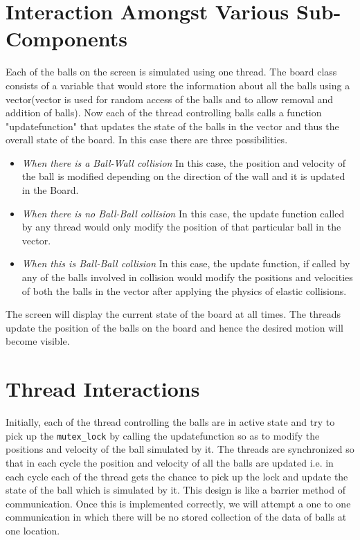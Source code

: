 \documentclass{article}
\begin{document}
\section{Interaction Amongst Various Sub-Components}
Each of the balls on the screen is simulated using one thread. The board class consists of a variable that would store the information about all the balls using a vector(vector is used for random access of the balls and to allow removal and addition of balls). Now each of the thread controlling balls calls a function "updatefunction" that updates the state of the balls in the vector and thus the overall state of the board. In this case there are three possibilities.
\begin{itemize}
\item \textit{When there is a Ball-Wall collision} In this case, the position and velocity of the ball is modified depending on the direction of the wall and it is updated in the Board.
\item \textit{When there is no Ball-Ball collision} In this case, the update function called by any thread would only modify the position of that particular ball in the vector.
\item\textit{When this is Ball-Ball collision} In this case, the update function, if called by any of the balls involved in  collision would modify the positions and velocities of both the balls in the vector after applying the physics of elastic collisions. 
\end{itemize}
The screen will display the current state of the board at all times. The threads update the position of the balls on the board and hence the desired motion will become visible.

\section{Thread Interactions}
Initially, each of the thread controlling the balls are in active state and try to pick up the \texttt{mutex\_lock} by calling the updatefunction so as to modify the positions and velocity of the ball simulated by it. The threads are synchronized so that in each cycle the position and velocity of all the balls are updated i.e. in each cycle each of the thread gets the chance to pick up the lock and update the state of the ball which is simulated by it. This design is like a barrier method of communication. Once this is implemented correctly, we will attempt a one to one communication in which there will be no stored collection of the data of balls at one location.  
\end{document}
